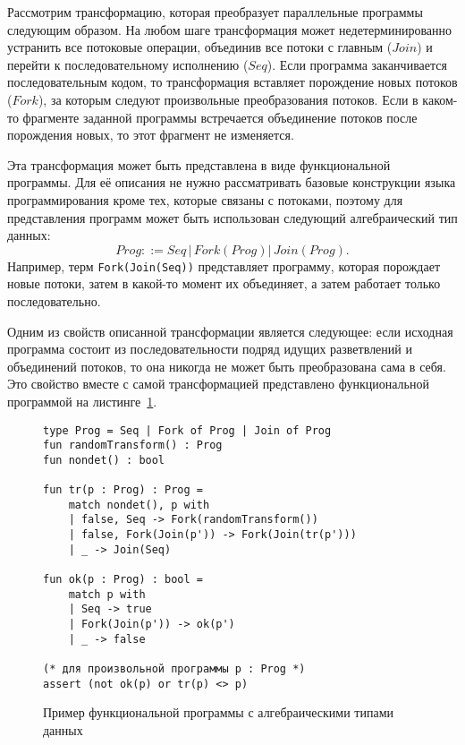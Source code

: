 \begin{example}[$ForkJoin$]\label{ex:fork-join-chcs}
Рассмотрим трансформацию, которая преобразует параллельные программы следующим образом. 
На любом шаге трансформация может недетерминированно устранить все потоковые операции, объединив все потоки с главным ($Join$) и перейти к последовательному исполнению ($Seq$).
Если программа заканчивается последовательным кодом, то трансформация вставляет порождение новых потоков ($Fork$), за которым следуют произвольные преобразования потоков.
Если в каком-то фрагменте заданной программы встречается объединение потоков после порождения новых, то этот фрагмент не изменяется.

Эта трансформация может быть представлена в виде функциональной программы. Для её описания не нужно рассматривать базовые конструкции языка программирования кроме тех, которые связаны с потоками, поэтому для представления программ может быть использован следующий алгебраический тип данных:
$$ Prog ::= Seq\,|\,Fork(Prog)|\,Join(Prog). $$
Например, терм \texttt{Fork(Join(Seq))} представляет программу, которая порождает новые потоки, затем в какой-то момент их объединяет, а затем работает только последовательно.

Одним из свойств описанной трансформации является следующее: если исходная программа состоит из последовательности подряд идущих разветвлений и объединений потоков, то она никогда не может быть преобразована сама в себя.
Это свойство вместе с самой трансформацией представлено функциональной программой на листинге~\ref{fig:ex-fork-join}.
{\renewcommand{\figurename}{Листинг}
\begin{figure}
    \centering
\begin{verbatim}
type Prog = Seq | Fork of Prog | Join of Prog
fun randomTransform() : Prog
fun nondet() : bool

fun tr(p : Prog) : Prog =
    match nondet(), p with
    | false, Seq -> Fork(randomTransform())
    | false, Fork(Join(p')) -> Fork(Join(tr(p')))
    | _ -> Join(Seq)

fun ok(p : Prog) : bool =
    match p with
    | Seq -> true
    | Fork(Join(p')) -> ok(p')
    | _ -> false

(* для произвольной программы p : Prog *)
assert (not ok(p) or tr(p) <> p)
\end{verbatim}
    \caption{Пример функциональной программы с алгебраическими типами данных}
    \label{fig:ex-fork-join}
\end{figure}}


\end{example}
